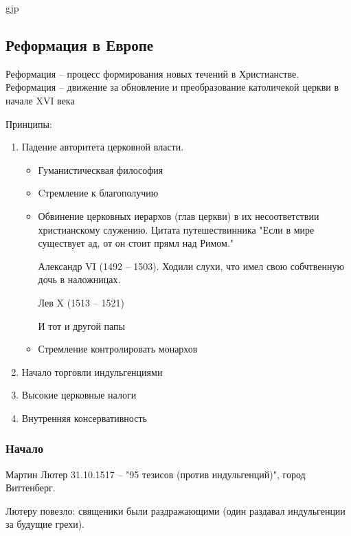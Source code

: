 gjp	 \documentclass[12pt,a4paper]{article}
\begin{document}
\begin{enumerate}
\subsection{Реформация в Европе}
Реформация -- процесс формирования новых течений в Христианстве.
Реформация -- движение за обновление и преобразование католичекой церкви в начале XVI века

Принципы:
\begin{enumerate}
	\item Падение авторитета церковной власти.
	\begin{itemize}
		\item Гуманистическвая философия
		\item Cтремление к благополучию
		\item Обвинение церковных иерархов (глав церкви) в их несоответствии христианскому служению. Цитата путешествинника "Если в мире существует ад, от он стоит прямл над Римом." 
		
		Александр VI (1492 -- 1503). Ходили слухи, что имел свою собчтвенную дочь в наложницах.
		
		Лев X (1513 -- 1521)
		
		И тот и другой папы
		\item Стремление контролировать монархов 
	\end{itemize}
	\item Начало торговли индульгенциями
	\item Высокие церковные налоги
	\item Внутренняя консервативность
\end{enumerate}

\end{enumerate}
\subsubsection{Начало}

Мартин Лютер 31.10.1517 -- "95 тезисов (против индульгенций)", город Виттенберг.

Лютеру повезло: священики были раздражающими (один раздавал индульгенции за будущие грехи).
\end{document}
